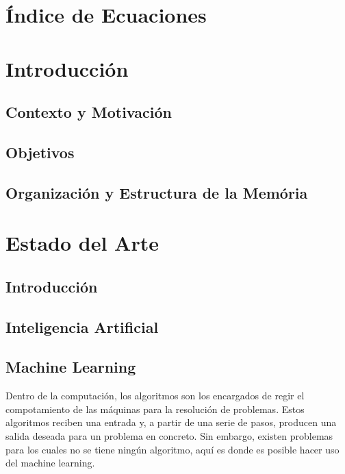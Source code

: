 \documentclass[a4paper,12pt]{article}
\begin{document}
\newpage

\section*{Índice de Ecuaciones}



\section{Introducción}

\subsection{Contexto y Motivación}

\subsection{Objetivos}

\subsection{Organización y Estructura de la Memória}



\section{Estado del Arte}

\subsection{Introducción}

\subsection{Inteligencia Artificial}

\subsection{Machine Learning}

Dentro de la computación, los algoritmos son los encargados
de regir el compotamiento de las máquinas para la resolución
de problemas. Estos algoritmos reciben una entrada y, a partir
de una serie de pasos, producen una salida deseada para un 
problema en concreto. Sin embargo, existen problemas para los 
cuales no se tiene ningún algoritmo, aquí es donde es posible 
hacer uso del machine learning.
\end{document}

